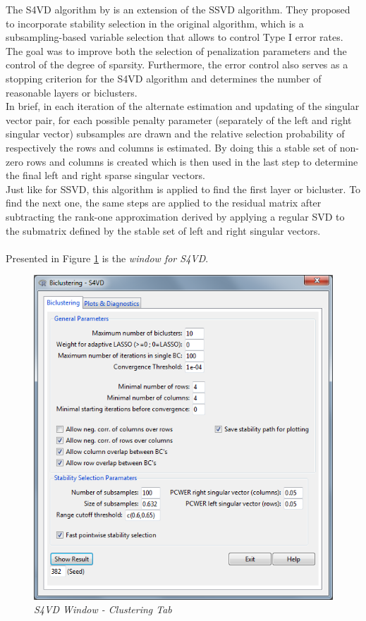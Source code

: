 \documentclass[a4paper]{article}\usepackage[]{graphicx}\usepackage[]{color}
\begin{document}
The S4VD algorithm by \citet{Sill2011} is an extension of the SSVD algorithm.
They proposed to incorporate stability selection in the original algorithm,
which is a subsampling-based variable selection that allows to control Type I error rates.
The goal was to improve both the selection
of penalization parameters and the control of the degree of sparsity.
Furthermore, the error control also serves as a stopping criterion for the S4VD algorithm and
determines the number of reasonable layers or biclusters.\\
In brief, in each iteration of the alternate estimation and updating of the
singular vector pair, for each possible penalty parameter (separately
of the left and right singular vector) subsamples are drawn and the
relative selection probability of respectively the rows and columns is
estimated. By doing this a stable set of non-zero rows and columns is created
which is then used in the last step to determine the final left and right sparse
singular vectors.\\
Just like for SSVD, this algorithm is applied to find the first layer or
bicluster. To find the next one, the same steps are applied to the residual
matrix after subtracting the rank-one approximation derived by applying a
regular SVD to the submatrix defined by the stable set of left and right
singular vectors.
\\ \\
Presented in Figure \ref{s4vd_clusttab} is the {\it window for S4VD}.
\begin{figure}[H]
\centering
\includegraphics[scale=0.5]{figures/s4vd_clusttab.png}
\caption{{\it S4VD Window - Clustering Tab}\label{s4vd_clusttab}}
\end{figure}
\end{document}

